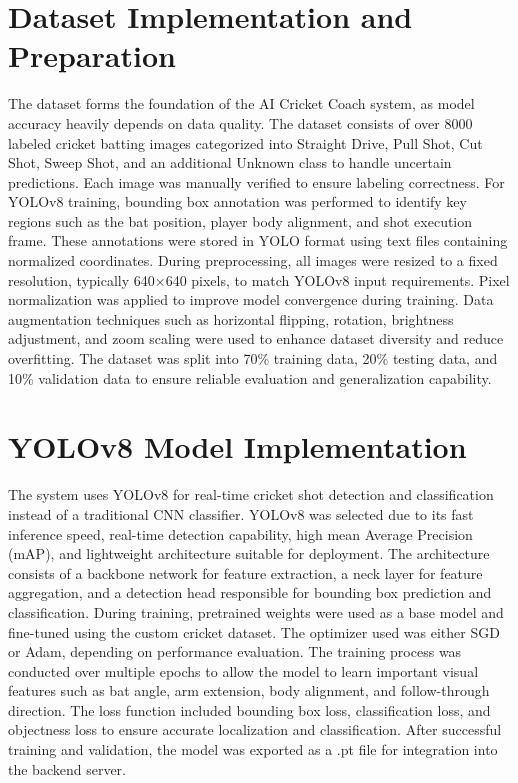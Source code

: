 \section{Dataset Implementation and Preparation} \label{S6.2}

The dataset forms the foundation of the AI Cricket Coach system, as model accuracy heavily depends on data quality. The dataset consists of over 8000 labeled cricket batting images categorized into Straight Drive, Pull Shot, Cut Shot, Sweep Shot, and an additional Unknown class to handle uncertain predictions. Each image was manually verified to ensure labeling correctness. For YOLOv8 training, bounding box annotation was performed to identify key regions such as the bat position, player body alignment, and shot execution frame. These annotations were stored in YOLO format using text files containing normalized coordinates. During preprocessing, all images were resized to a fixed resolution, typically 640×640 pixels, to match YOLOv8 input requirements. Pixel normalization was applied to improve model convergence during training. Data augmentation techniques such as horizontal flipping, rotation, brightness adjustment, and zoom scaling were used to enhance dataset diversity and reduce overfitting. The dataset was split into 70\% training data, 20\% testing data, and 10\% validation data to ensure reliable evaluation and generalization capability.

\section{YOLOv8 Model Implementation} \label{S6.3}

The system uses YOLOv8 for real-time cricket shot detection and classification instead of a traditional CNN classifier. YOLOv8 was selected due to its fast inference speed, real-time detection capability, high mean Average Precision (mAP), and lightweight architecture suitable for deployment. The architecture consists of a backbone network for feature extraction, a neck layer for feature aggregation, and a detection head responsible for bounding box prediction and classification. During training, pretrained weights were used as a base model and fine-tuned using the custom cricket dataset. The optimizer used was either SGD or Adam, depending on performance evaluation. The training process was conducted over multiple epochs to allow the model to learn important visual features such as bat angle, arm extension, body alignment, and follow-through direction. The loss function included bounding box loss, classification loss, and objectness loss to ensure accurate localization and classification. After successful training and validation, the model was exported as a .pt file for integration into the backend server.

